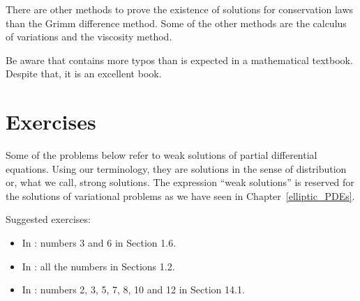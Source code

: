 There are other methods to prove the existence of solutions for
conservation laws than the Grimm difference method.  Some of the other
methods are the calculus of variations and the viscosity method.

Be aware that \cite{Smo} contains more typos than is expected in a
mathematical textbook.  Despite that, it is an excellent book.

\section{Exercises}

Some of the problems below refer to weak solutions of partial
differential equations.  Using our terminology, they are solutions in
the sense of distribution or, what we call, strong solutions.
The expression ``weak solutions'' is reserved for the solutions of
variational problems as we have seen in Chapter~\ref{elliptic_PDEs}.

Suggested exercises:

\begin{itemize}
\item In \cite{J}: numbers 3 and 6 in Section 1.6.
\item In \cite{McO}: all the numbers in Sections 1.2.
\item In \cite{Str}: numbers 2, 3, 5, 7, 8, 10 and 12 in Section 14.1.
\end{itemize}

